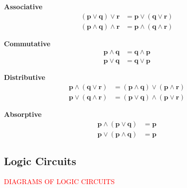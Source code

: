 \begin{law}\label{mod1:law:Associative}
   \textbf{Associative}
   \begin{align}
      \boldsymbol{(p \lor q) \lor r} &= \boldsymbol{p \lor (q \lor r)} \\
      \boldsymbol{(p \land q) \land r} &= \boldsymbol{p \land (q \land r)}
   \end{align}
\end{law}

 \begin{law}\label{mod1:law:Commutative}
   \textbf{Commutative}
   \begin{align}
      \boldsymbol{p \land q} &= \boldsymbol{q \land p} \\
      \boldsymbol{p \lor q} &= \boldsymbol{q \lor p}
   \end{align}
\end{law}

\begin{law}\label{mod1:law:Distributive}
   \textbf{Distributive}
   \begin{align}
      \boldsymbol{p \land (q \lor r)} &= \boldsymbol{(p \land q) \lor (p \land r)} \\
      \boldsymbol{p \lor (q \land r)} &= \boldsymbol{(p \lor q) \land (p \lor r) }
   \end{align}
\end{law}

\begin{law}\label{mod1:law:Absorptive}
   \textbf{Absorptive}
   \begin{align}
      \boldsymbol{p \land (p \lor q)} &= \boldsymbol{p}\\
      \boldsymbol{p \lor (p \land q)} &= \boldsymbol{p}
   \end{align}
\end{law}


\subsection{Logic Circuits}\label{mod1:section:LogicCircuits}

\textcolor{red}{DIAGRAMS OF LOGIC CIRCUITS}








      
      
      
      
      
      
      
      
      
      
      
      